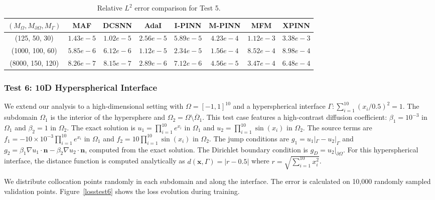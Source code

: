 \documentclass{article}
\begin{document}
\begin{table}[H]
    \centering
    \caption{Relative $L^2$ error comparison for Test 5.}
    \label{errortabletest5}
    \small
    \begin{tabular}{|c|c|c|c|c|c|c|c|}
        \hline
        $(M_\Omega, M_{\partial\Omega}, M_\Gamma)$ & MAF & DCSNN & AdaI & I-PINN & M-PINN & MFM & XPINN \\
        \hline
        (125, 50, 30) & $1.43e{-}5$ & $1.02e{-}5$ & $2.56e{-}5$ & $5.89e{-}5$ & $4.23e{-}4$ & $1.12e{-}3$ & $3.38e{-}3$ \\
        \hline
        (1000, 100, 60) & $5.85e{-}6$ & $6.12e{-}6$ & $1.12e{-}5$ & $2.34e{-}5$ & $1.56e{-}4$ & $8.52e{-}4$ & $8.98e{-}4$ \\
        \hline
        (8000, 150, 120) & $8.26e{-}7$ & $8.15e{-}7$ & $2.89e{-}6$ & $7.12e{-}6$ & $4.56e{-}5$ & $3.47e{-}4$ & $6.48e{-}4$ \\
        \hline
    \end{tabular}
\end{table}


\subsubsection{Test 6: 10D Hyperspherical Interface}

We extend our analysis to a high-dimensional setting with $\Omega = [-1,1]^{10}$ and a hyperspherical interface $\Gamma: \sum_{i=1}^{10} (x_i/0.5)^2 = 1$. The subdomain $\Omega_1$ is the interior of the hypersphere and $\Omega_2 = \Omega \setminus \overline{\Omega}_1$. This test case features a high-contrast diffusion coefficient: $\beta_1 = 10^{-3}$ in $\Omega_1$ and $\beta_2 = 1$ in $\Omega_2$. The exact solution is $u_1 = \prod_{i=1}^{10} e^{x_i}$ in $\Omega_1$ and $u_2 = \prod_{i=1}^{10} \sin(x_i)$ in $\Omega_2$. The source terms are $f_1 = -10 \times 10^{-3} \prod_{i=1}^{10} e^{x_i}$ in $\Omega_1$ and $f_2 = 10 \prod_{i=1}^{10} \sin(x_i)$ in $\Omega_2$. The jump conditions are $g_1 = u_1|_\Gamma - u_2|_\Gamma$ and $g_2 = \beta_1 \nabla u_1 \cdot \boldsymbol{n} - \beta_2 \nabla u_2 \cdot \boldsymbol{n}$, computed from the exact solution. The Dirichlet boundary condition is $g_D = u_2|_{\partial\Omega}$. For this hyperspherical interface, the distance function is computed analytically as $d(\mathbf{x}, \Gamma) = |r - 0.5|$ where $r = \sqrt{\sum_{i=1}^{10} x_i^2}$.

We distribute collocation points randomly in each subdomain and along the interface. The error is calculated on 10,000 randomly sampled validation points. Figure~\ref{losstest6} shows the loss evolution during training.
\end{document}
